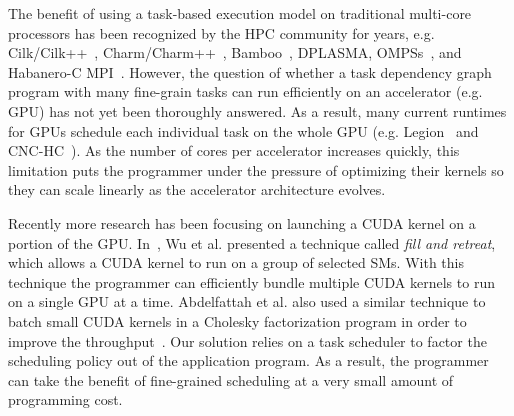 The benefit of using a task-based execution model on traditional multi-core processors has been recognized by the HPC community for years, e.g. Cilk/Cilk++~\cite{cilk,BlumofeJoKu95}, Charm/Charm++~\cite{charm++}, Bamboo~\cite{bamboo}, DPLASMA\cite{dplasma}, OMPSs~\cite{ompss}, and Habanero-C MPI~\cite{Chatterjee:2013:HCMPI}.
However, the question of whether a task dependency graph program with many fine-grain tasks can run efficiently on an accelerator (e.g. GPU) has not yet been thoroughly answered.
As a result, many current runtimes for GPUs schedule each individual task on the whole GPU (e.g. Legion~\cite{legion} and CNC-HC~\cite{cnc-hc}).
As the number of cores per accelerator increases quickly, this limitation puts the programmer under the pressure of optimizing their kernels so they can scale linearly as the accelerator architecture evolves.

Recently more research has been focusing on launching a CUDA kernel on a portion of the GPU.
In~\cite{fillNRetreat}, Wu et al. presented a technique called {\em fill and retreat}, which allows a CUDA kernel to run on a group of selected SMs.
With this technique the programmer can efficiently bundle multiple CUDA kernels to run on a single GPU at a time.
Abdelfattah et al. also used a similar technique to batch small CUDA kernels in a Cholesky factorization program in order to improve the throughput~\cite{batchedCholesky}.
Our solution relies on a task scheduler to factor the scheduling policy out of the application program.
As a result, the programmer can take the benefit of fine-grained scheduling at a very small amount of programming cost.


